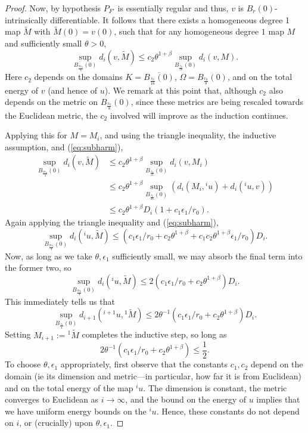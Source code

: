 \documentclass[12pt]{amsart}
\theoremstyle{definition}
\numberwithin{equation}{section}
\begin{document}
\begin{proof}
Now, by hypothesis $P_{F'}$ is essentially regular and thus, $v$ is $B_r(0)$-intrinsically differentiable. It follows that there exists a homogeneous degree 1 map $ \widetilde M$ with $\widetilde M(0)=v(0)$, such that for any homogeneous degree $1$ map $M$ and sufficiently small $\theta>0$, 
\[
\sup_{B_{\frac{\theta r_0}4}(0)}d_i(v,\widetilde M)\leq c_2\theta^{1+\beta}\sup_{B_{\frac{r_0}{16}}(0)}d_i(v,M).
\]
Here $c_2$ depends on the domains $K=\overline{B_{\frac{r_0}{16}}(0)}$, $\Omega=B_{\frac{r_0}8}(0)$, and on the total energy of $v$ (and hence of $u$).  We remark at this point that, although $c_2$  also depends on the metric on $B_{\frac{r_0}8}(0)$, since these metrics are being rescaled towards the Euclidean metric, the $c_2$ involved will improve as the induction continues. 

Applying this for $M=M_i$, and using the triangle inequality, the inductive assumption, and (\ref{eq:subharm}),
\begin{align*}
\sup_{B_{\frac{\theta r_0}4}(0)}d_i(v,\widetilde M)&\leq c_2\theta^{1+\beta}\sup_{B_{\frac{r_0}{16}}(0)}d_i(v,M_i)\\
&\leq c_2\theta^{1+\beta}\sup_{B_{\frac{r_0}{16}}(0)}\left(d_i(M_i,{^iu})+d_i({^iu},v)\right)\\
&\leq c_2\theta^{1+\beta}D_i(1+c_1\epsilon_1/r_0).
\end{align*}
Again applying the triangle inequality and (\ref{eq:subharm}),
\[
\sup_{B_{\frac{\theta r_0}4}(0)}d_i({^iu},\widetilde M)\leq (c_1\epsilon_1/r_0+c_2\theta^{1+\beta}+c_1c_2\theta^{1+\beta}\epsilon_1/r_0)D_i.
\]
Now, as long as we take $\theta,\epsilon_1$ sufficiently small, we may absorb the final term into the former two, so
\begin{equation}\label{eq:keyind}
\sup_{B_{\frac{\theta r_0}4}(0)}d_i(^iu,{{\widetilde M}})\leq2(c_1\epsilon_1/r_0+c_2\theta^{1+\beta})D_i.
\end{equation}
This immediately tells us that
\[
\sup_{B_{\frac {r_0}4}(0)}d_{i+1}({^{i+1}u},{^1{\widetilde M}})\leq2\theta^{-1}(c_1\epsilon_1/r_0+c_2\theta^{1+\beta})D_i.
\]
Setting $M_{i+1}:={^1{\widetilde M}}$ completes the inductive step, so long as
\[
2\theta^{-1}(c_1\epsilon_1/r_0+c_2\theta^{1+\beta})\leq\frac{1}{2}.
\]
To choose $\theta, \epsilon_1$ appropriately, first observe that the constants $c_1,c_2$ depend on the domain (ie its dimension and metric---in particular, how far it is from Euclidean) and on the total energy of the map $^iu$.  The dimension is constant, the metric converges to Euclidean as $i\to\infty$, and the bound on the energy of $u$ implies that we have uniform energy bounds on the ${^iu}$.  Hence, these constants do not depend on $i$, or (crucially) upon $\theta,\epsilon_1$.


\end{proof}
\end{document}
